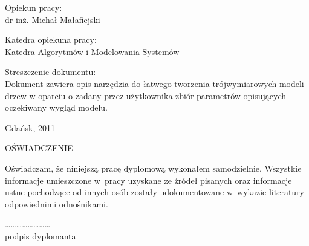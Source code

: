 \documentclass[a4paper,12pt]{report}
\begin{document}
\begin{par}
	Opiekun pracy: \\
	dr inż. Michał Małafiejski

	\vspace{5mm}

	Katedra opiekuna pracy: \\
	Katedra Algorytmów i Modelowania Systemów

	\vspace{15mm}

	Streszczenie dokumentu: \\
	Dokument zawiera opis narzędzia do łatwego tworzenia trójwymiarowych modeli
	drzew w oparciu o zadany przez użytkownika zbiór parametrów opisujących oczekiwany wygląd modelu.
\end{par}

\begin{par}
	\begin{center}
		Gdańsk, 2011
	\end{center}
\end{par}

\newpage
\begin{par}
	\begin{center}
		\large
		\underline{OŚWIADCZENIE}
	\end{center}
\end{par}

\begin{par}
	Oświadczam, że niniejszą pracę dyplomową wykonałem samodzielnie. Wszystkie
	informacje umieszczone w~pracy uzyskane ze źródeł pisanych oraz informacje ustne
	pochodzące od innych osób zostały udokumentowane w~wykazie literatury
	odpowiednimi odnośnikami.
\end{par}

\vspace{20mm}


\begin{par}
	\begin{flushright}
		\ldots\ldots\ldots\ldots\ldots\ldots\ldots\ldots \\
		podpis dyplomanta
	\end{flushright}
\end{par}

\tableofcontents






\end{document}
